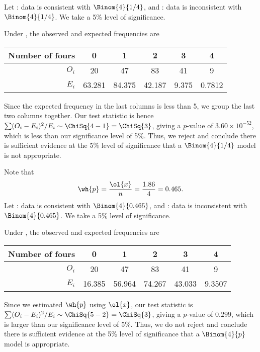 \begin{solution}
    \begin{ppart}
        Let \nullhyp: data is consistent with $\Binom{4}{1/4}$, and \althyp: data is inconsistent with $\Binom{4}{1/4}$. We take a 5\% level of significance.

        Under \nullhyp, the observed and expected frequencies are
        \begin{table}[H]
            \centering
            \begin{tabular}{|r|c|c|c|c|c|}
            \hline
            Number of fours & 0 & 1 & 2 & 3 & 4 \\ \hline
            $O_i$ & 20 & 47 & 83 & 41 & 9 \\ \hline
            $E_i$ & 63.281 & 84.375 & 42.187 & 9.375 & 0.7812 \\ \hline
            \end{tabular}
        \end{table}
    
        Since the expected frequency in the last columns is less than 5, we group the last two columns together. Our test statistic is hence $\sum (O_i - E_i)^2 / E_i \sim \ChiSq{4-1} = \ChiSq{3}$, giving a $p$-value of $3.60 \times 10^{-52}$, which is less than our significance level of 5\%. Thus, we reject \nullhyp{} and conclude there is sufficient evidence at the 5\% level of significance that a $\Binom{4}{1/4}$ model is not appropriate.
    \end{ppart}
    \begin{ppart}
        Note that \[\wh{p} = \frac{\ol{x}}{n} = \frac{1.86}{4} = 0.465.\] Let \nullhyp: data is consistent with $\Binom{4}{0.465}$, and \althyp: data is inconsistent with $\Binom{4}{0.465}$. We take a 5\% level of significance.

        Under \nullhyp, the observed and expected frequencies are
        \begin{table}[H]
            \centering
            \begin{tabular}{|r|c|c|c|c|c|}
            \hline
            Number of fours & 0 & 1 & 2 & 3 & 4 \\ \hline
            $O_i$ & 20 & 47 & 83 & 41 & 9 \\ \hline
            $E_i$ & 16.385 & 56.964 & 74.267 & 43.033 & 9.3507 \\ \hline
            \end{tabular}
        \end{table}
    
        Since we estimated $\wh{p}$ using $\ol{x}$, our test statistic is $\sum (O_i - E_i)^2 / E_i \sim \ChiSq{5-2} = \ChiSq{3}$, giving a $p$-value of $0.299$, which is larger than our significance level of 5\%. Thus, we do not reject \nullhyp{} and conclude there is sufficient evidence at the 5\% level of significance that a $\Binom{4}{p}$ model is appropriate.
    \end{ppart}
\end{solution}

